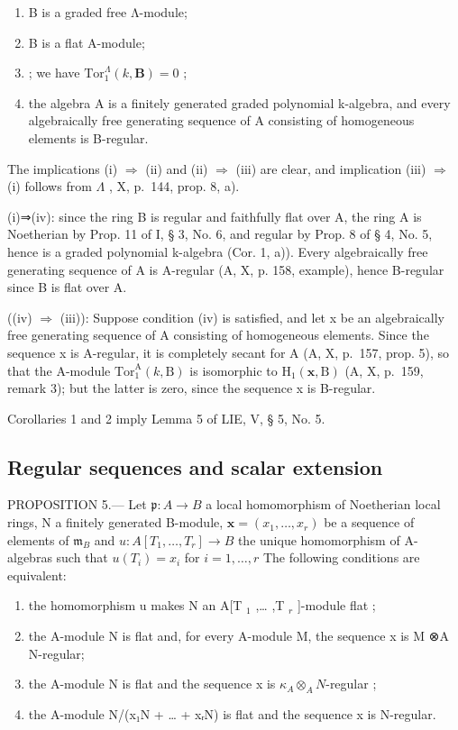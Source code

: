 \begin{enumerate}
\def\labelenumi{(\roman{enumi})}
\item
  B is a graded free Λ-module;
\item
  B is a flat A-module;
\item
  ; we have \(\mathrm{Tor}_1^\Lambda (k,\mathbf{B}) = 0\) ;
\item
  the algebra A is a finitely generated graded polynomial k-algebra, and every algebraically free generating sequence of A consisting of homogeneous elements is B-regular.
\end{enumerate}

The implications (i) \(\Rightarrow\) (ii) and (ii) \(\Rightarrow\) (iii) are clear, and implication (iii) \(\Rightarrow\) (i) follows from \(\Lambda\) , X, p.~144, prop. 8, a).

(i)⇒(iv): since the ring B is regular and faithfully flat over A, the ring A is Noetherian by Prop. 11 of I, § 3, No. 6, and regular by Prop. 8 of § 4, No. 5, hence is a graded polynomial k-algebra (Cor. 1, a)). Every algebraically free generating sequence of A is A-regular (A, X, p. 158, example), hence B-regular since B is flat over A.

((iv) \(\Rightarrow\) (iii)): Suppose condition (iv) is satisfied, and let x be an algebraically free generating sequence of A consisting of homogeneous elements. Since the sequence x is A-regular, it is completely secant for A (A, X, p.~157, prop. 5), so that the A-module \(\mathrm{Tor}_{1}^{\mathrm{A}}(k,\mathrm{B})\) is isomorphic to \(\mathrm{H}_{1}(\mathbf{x},\mathrm{B})\) (A, X, p.~159, remark 3); but the latter is zero, since the sequence x is B-regular.

Corollaries 1 and 2 imply Lemma 5 of LIE, V, § 5, No. 5.

\subsection{Regular sequences and scalar extension}

PROPOSITION 5.--- Let \(\mathfrak{p}: A \to B\) a local homomorphism of Noetherian local rings, N a finitely generated B-module, \(\mathbf{x} = (x_1, \ldots, x_r)\) be a sequence of elements of \(\mathfrak{m}_B\) and \(u: A[T_1, \ldots, T_r] \longrightarrow B\) the unique homomorphism of A-algebras such that \(u(T_i) = x_i\) for \(i = 1, \ldots, r\) The following conditions are equivalent:

\begin{enumerate}
\def\labelenumi{(\roman{enumi})}
\item
  the homomorphism u makes N an A{[}T \(_{1}\) ,\ldots{} ,T \(_{r}\) {]}-module flat ;
\item
  the A-module N is flat and, for every A-module M, the sequence x is M ⊗A N-regular;
\item
  the A-module N is flat and the sequence x is \(\kappa_{A} \otimes_{A} N\)-regular ;
\item
  the A-module N/(x₁N + \ldots{} + xᵣN) is flat and the sequence x is N-regular.
\end{enumerate}

